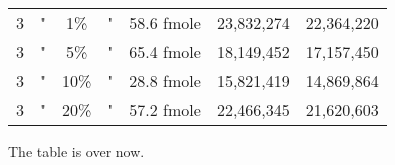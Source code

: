 \begin{table}[htdp]
\begin{center}
\begin{tabular}{|c|c|c|c|c|c|c|}
3 & " & 1\% & " & 58.6 fmole & 23,832,274 &22,364,220 \\
3 & " & 5\% & " & 65.4 fmole & 18,149,452 &17,157,450 \\
3 & " & 10\% & " & 28.8 fmole & 15,821,419 &14,869,864 \\
3 & " & 20\% & " & 57.2 fmole & 22,466,345 &21,620,603 \\
\hline
\end{tabular}
\label{tab:protocols}
\end{center}
\end{table}
      

The table is over now.